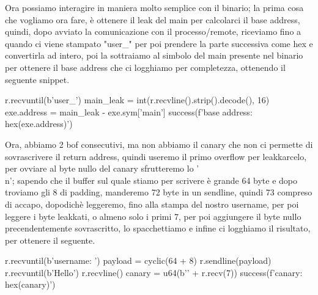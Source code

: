\documentclass[main.tex]{subfiles}
\begin{document}
Ora possiamo interagire in maniera molto semplice con il binario; la prima cosa che vogliamo ora fare, è ottenere il leak del main per calcolarci il base address, quindi, dopo avviato la comunicazione con il processo/remote, riceviamo fino a quando ci viene stampato "user\_" per poi prendere la parte successiva come hex e convertirla ad intero, poi la sottraiamo al simbolo del main presente nel binario per ottenere il base address che ci logghiamo per completezza, ottenendo il seguente snippet.

\begin{python}
r.recvuntil(b'user_')
main_leak = int(r.recvline().strip().decode(), 16)
exe.address = main_leak - exe.sym['main']
success(f'base address: {hex(exe.address)}')
\end{python}

Ora, abbiamo 2 bof consecutivi, ma non abbiamo il canary che non ci permette di sovrascrivere il return address, quindi useremo il primo overflow per leakkarcelo, per ovviare al byte nullo del canary sfrutteremo lo '\\n'; sapendo che il buffer sul quale stiamo per scrivere è grande 64 byte e dopo troviamo gli 8 di padding, manderemo 72 byte in un sendline, quindi 73 compreso di accapo, dopodichè leggeremo, fino alla stampa del nostro username, per poi leggere i byte leakkati, o almeno solo i primi 7, per poi aggiungere il byte nullo precendentemente sovrascritto, lo spacchettiamo e infine ci logghiamo il risultato, per ottenere il seguente.

\begin{python}
r.recvuntil(b'username: ')
payload = cyclic(64 + 8)
r.sendline(payload)
r.recvuntil(b'Hello')
r.recvline()
canary = u64(b'' + r.recv(7))
success(f'canary: {hex(canary)}')
\end{python}
\end{document}
